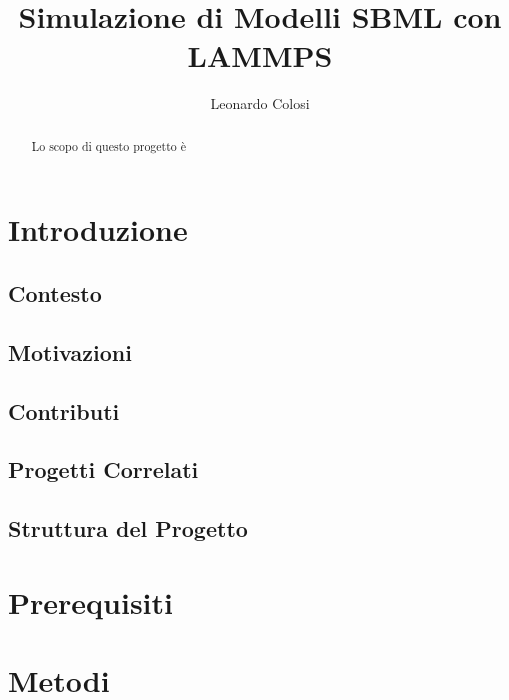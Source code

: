 \documentclass[Lau, oneside]{sapthesis}
\title{Simulazione di Modelli SBML con LAMMPS}
\author{Leonardo Colosi}
\begin{document}
\frontmatter
\maketitle

\begin{abstract}

Lo scopo di questo progetto \`e
\end{abstract}

\tableofcontents
\mainmatter

\chapter{Introduzione}



\section{Contesto}
\label{sec:ctx}

\section{Motivazioni}
\label{sec:mtv}

\section{Contributi}
\label{sec:ctb}

\section{Progetti Correlati}
\label{sec:rlt}

\section{Struttura del Progetto}
\label{sec:otl}

%
\chapter{Prerequisiti}
\label{chap:2}

\chapter{Metodi}
\label{chap:3}
\end{document}

